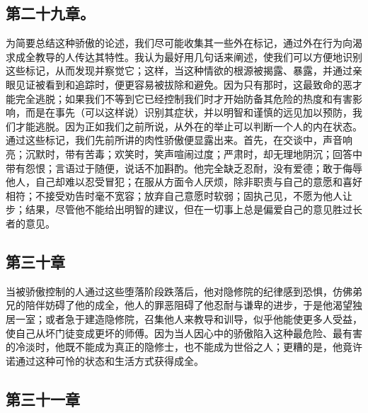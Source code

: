 
\subsection{第二十九章。}

\par

为简要总结这种骄傲的论述，我们尽可能收集其一些外在标记，通过外在行为向渴求成全教导的人传达其特性。我认为最好用几句话来阐述，使我们可以方便地识别这些标记，从而发现并察觉它；这样，当这种情欲的根源被揭露、暴露，并通过亲眼见证被看到和追踪时，便更容易被拔除和避免。因为只有那时，这最致命的恶才能完全逃脱；如果我们不等到它已经控制我们时才开始防备其危险的热度和有害影响，而是在事先（可以这样说）识别其症状，并以明智和谨慎的远见加以预防，我们才能逃脱。因为正如我们之前所说，从外在的举止可以判断一个人的内在状态。通过这些标记，我们先前所讲的肉性骄傲便显露出来。首先，在交谈中，声音响亮；沉默时，带有苦毒；欢笑时，笑声喧闹过度；严肃时，却无理地阴沉；回答中带有怨恨；言语过于随便，说话不加斟酌。他完全缺乏忍耐，没有爱德；敢于侮辱他人，自己却难以忍受冒犯；在服从方面令人厌烦，除非职责与自己的意愿和喜好相符；不接受劝告时毫不宽容；放弃自己意愿时软弱；固执己见，不愿为他人让步；结果，尽管他不能给出明智的建议，但在一切事上总是偏爱自己的意见胜过长者的意见。\par


\subsection{第三十章}

\par

当被骄傲控制的人通过这些堕落阶段跌落后，他对隐修院的纪律感到恐惧，仿佛弟兄的陪伴妨碍了他的成全，他人的罪恶阻碍了他忍耐与谦卑的进步，于是他渴望独居一室；或者急于建造隐修院，召集他人来教导和训导，似乎他能使更多人受益，使自己从坏门徒变成更坏的师傅。因为当人因心中的骄傲陷入这种最危险、最有害的冷淡时，他既不能成为真正的隐修士，也不能成为世俗之人；更糟的是，他竟许诺通过这种可怜的状态和生活方式获得成全。\par


\subsection{第三十一章}


